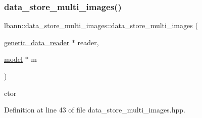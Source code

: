 \subsubsection{\texorpdfstring{data\+\_\+store\+\_\+multi\+\_\+images()}{data\_store\_multi\_images()}\hspace{0.1cm}{\footnotesize\ttfamily [1/2]}}
{\footnotesize\ttfamily lbann\+::data\+\_\+store\+\_\+multi\+\_\+images\+::data\+\_\+store\+\_\+multi\+\_\+images (\begin{DoxyParamCaption}\item[{\hyperlink{classlbann_1_1generic__data__reader}{generic\+\_\+data\+\_\+reader} $\ast$}]{reader,  }\item[{\hyperlink{classlbann_1_1model}{model} $\ast$}]{m }\end{DoxyParamCaption})\hspace{0.3cm}{\ttfamily [inline]}}



ctor 



Definition at line 43 of file data\+\_\+store\+\_\+multi\+\_\+images.\+hpp.


